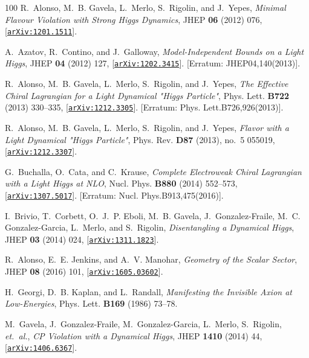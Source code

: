 \documentclass[11pt]{article}
\renewcommand{\[}{\begin{equation}}
\renewcommand{\]}{\end{equation}}
\begin{document}
\begin{thebibliography}{100}
R.~Alonso, M.~B. Gavela, L.~Merlo, S.~Rigolin, and J.~Yepes, {\it {Minimal
  Flavour Violation with Strong Higgs Dynamics}},  JHEP {\bf 06} (2012) 076,
  [\href{http://xxx.lanl.gov/abs/1201.1511}{{\tt arXiv:1201.1511}}].

A.~Azatov, R.~Contino, and J.~Galloway, {\it {Model-Independent Bounds on a
  Light Higgs}},  JHEP {\bf 04} (2012) 127,
  [\href{http://xxx.lanl.gov/abs/1202.3415}{{\tt arXiv:1202.3415}}]. [Erratum:
  JHEP04,140(2013)].

R.~Alonso, M.~B. Gavela, L.~Merlo, S.~Rigolin, and J.~Yepes, {\it {The
  Effective Chiral Lagrangian for a Light Dynamical "Higgs Particle"}},  Phys.
  Lett. {\bf B722} (2013) 330--335,
  [\href{http://xxx.lanl.gov/abs/1212.3305}{{\tt arXiv:1212.3305}}]. [Erratum:
  Phys. Lett.B726,926(2013)].

R.~Alonso, M.~B. Gavela, L.~Merlo, S.~Rigolin, and J.~Yepes, {\it {Flavor with
  a Light Dynamical "Higgs Particle"}},  Phys. Rev. {\bf D87} (2013), no.~5
  055019, [\href{http://xxx.lanl.gov/abs/1212.3307}{{\tt arXiv:1212.3307}}].

G.~Buchalla, O.~Cata, and C.~Krause, {\it {Complete Electroweak Chiral
  Lagrangian with a Light Higgs at NLO}},  Nucl. Phys. {\bf B880} (2014)
  552--573, [\href{http://xxx.lanl.gov/abs/1307.5017}{{\tt arXiv:1307.5017}}].
  [Erratum: Nucl. Phys.B913,475(2016)].

I.~Brivio, T.~Corbett, O.~J.~P. Eboli, M.~B. Gavela, J.~Gonzalez-Fraile, M.~C.
  Gonzalez-Garcia, L.~Merlo, and S.~Rigolin, {\it {Disentangling a Dynamical
  Higgs}},  JHEP {\bf 03} (2014) 024,
  [\href{http://xxx.lanl.gov/abs/1311.1823}{{\tt arXiv:1311.1823}}].

R.~Alonso, E.~E. Jenkins, and A.~V. Manohar, {\it {Geometry of the Scalar
  Sector}},  JHEP {\bf 08} (2016) 101,
  [\href{http://xxx.lanl.gov/abs/1605.03602}{{\tt arXiv:1605.03602}}].

H.~Georgi, D.~B. Kaplan, and L.~Randall, {\it {Manifesting the Invisible Axion
  at Low-Energies}},  Phys. Lett. {\bf B169} (1986) 73--78.

M.~Gavela, J.~Gonzalez-Fraile, M.~Gonzalez-Garcia, L.~Merlo, S.~Rigolin, {\em
  et.~al.}, {\it {CP Violation with a Dynamical Higgs}},  JHEP {\bf 1410}
  (2014) 44, [\href{http://xxx.lanl.gov/abs/1406.6367}{{\tt arXiv:1406.6367}}].


\end{thebibliography}
\end{document}
